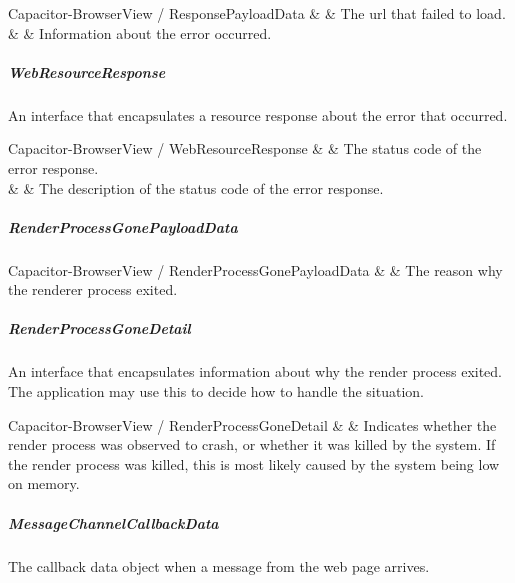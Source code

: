 \begin{interfacedesc}{Capacitor-BrowserView / ResponsePayloadData}
             &               & The \ac{url} that failed to load. \\ \hline
   &  & Information about the error occurred. \\ \hline
\end{interfacedesc}

\subparagraph{WebResourceResponse}

An interface that encapsulates a resource response about the error that occurred.

\begin{interfacedesc}{Capacitor-BrowserView / WebResourceResponse}
   &  & The status code of the error response. \\ \hline
     &  & The description of the status code of the error response. \\ \hline
\end{interfacedesc}

\newpage

\subparagraph{RenderProcessGonePayloadData}

\begin{interfacedesc}{Capacitor-BrowserView / RenderProcessGonePayloadData}
   &  & The reason why the renderer process exited. \\ \hline
\end{interfacedesc}

\subparagraph{RenderProcessGoneDetail}

An interface that encapsulates information about why the render process exited.
The application may use this to decide how to handle the situation.

\begin{interfacedesc}{Capacitor-BrowserView / RenderProcessGoneDetail}
   &  & Indicates whether the render process was observed to crash, or whether it was killed by the system. If the render process was killed, this is most likely caused by the system being low on memory. \\ \hline
\end{interfacedesc}

\subparagraph{MessageChannelCallbackData}

The callback data object when a message from the web page arrives.

